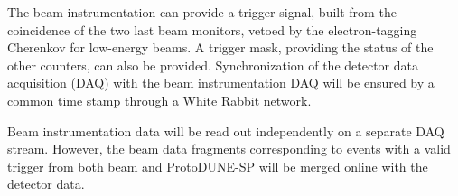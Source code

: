 The beam instrumentation can provide a trigger signal, built from the coincidence of the two last beam monitors, vetoed by the electron-tagging Cherenkov for low-energy beams. 
A trigger mask, providing the status of the other counters, can also be provided. 
 Synchronization of the detector data acquisition (DAQ) with the beam instrumentation DAQ will be ensured by a common time stamp through a White Rabbit network.

Beam instrumentation data will be read out independently on a separate DAQ stream. However,  
the beam data fragments corresponding to  events with a valid trigger from both beam and ProtoDUNE-SP will be merged online with the detector data.
 